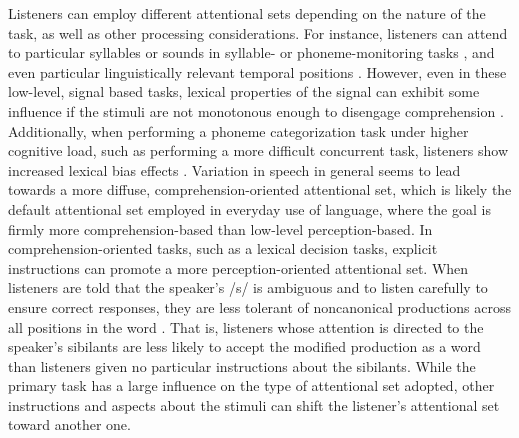 Listeners can employ different attentional sets depending on the nature of the task, as well as other processing considerations.
For instance, listeners can attend to particular syllables or sounds in syllable- or phoneme-monitoring tasks \citep[and others]{Norris1988}, and even particular linguistically relevant temporal positions \citep{Pitt1990}.
However, even in these low-level, signal based tasks, lexical properties of the signal can exhibit some influence if the stimuli are not monotonous enough to disengage comprehension \citep{Cutler1987}.  
Additionally, when performing a phoneme categorization task under higher cognitive load, such as performing a more difficult concurrent task, listeners show increased lexical bias effects \citep{Mattys2011}.
Variation in speech in general seems to lead towards a more diffuse, comprehension-oriented attentional set, which is likely the default attentional set employed in everyday use of language, where the goal is firmly more comprehension-based than low-level perception-based.
In comprehension-oriented tasks, such as a lexical decision tasks, explicit instructions can promote a more perception-oriented attentional set.
When listeners are told that the speaker's /s/ is ambiguous and to listen carefully to ensure correct responses, they are less tolerant of noncanonical productions across all positions in the word \citep{Pitt2012}.  
That is, listeners whose attention is directed to the speaker's sibilants are less likely to accept the modified production as a word than listeners given no particular instructions about the sibilants.
While the primary task has a large influence on the type of attentional set adopted, other instructions and aspects about the stimuli can shift the listener's attentional set toward another one.

